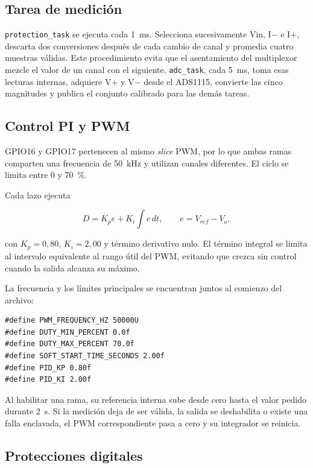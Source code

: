 \documentclass[conference]{IEEEtran}
\begin{document}
\subsection{Tarea de medición}

\texttt{protection\_task} se ejecuta cada 1~ms. Selecciona sucesivamente Vin, I$-$ e I$+$, descarta dos conversiones después de cada cambio de canal y promedia cuatro muestras válidas. Este procedimiento evita que el asentamiento del multiplexor mezcle el valor de un canal con el siguiente. \texttt{adc\_task}, cada 5~ms, toma esas lecturas internas, adquiere V$+$ y V$-$ desde el ADS1115, convierte las cinco magnitudes y publica el conjunto calibrado para las demás tareas.

\subsection{Control PI y PWM}

GPIO16 y GPIO17 pertenecen al mismo \textit{slice} PWM, por lo que ambas ramas comparten una frecuencia de 50~kHz y utilizan canales diferentes. El ciclo se limita entre 0 y 70~\%.

Cada lazo ejecuta

\begin{equation}
D=K_p e+K_i\int e\,dt, \qquad e=V_{ref}-V_o,
\end{equation}

con $K_p=0,80$, $K_i=2,00$ y término derivativo nulo. El término integral se limita al intervalo equivalente al rango útil del PWM, evitando que crezca sin control cuando la salida alcanza su máximo.

La frecuencia y los límites principales se encuentran juntos al comienzo del archivo:

\begin{lstlisting}[caption={Parámetros principales de PWM y control.}]
#define PWM_FREQUENCY_HZ 50000U
#define DUTY_MIN_PERCENT 0.0f
#define DUTY_MAX_PERCENT 70.0f
#define SOFT_START_TIME_SECONDS 2.00f
#define PID_KP 0.80f
#define PID_KI 2.00f
\end{lstlisting}

Al habilitar una rama, su referencia interna sube desde cero hasta el valor pedido durante 2~s. Si la medición deja de ser válida, la salida se deshabilita o existe una falla enclavada, el PWM correspondiente pasa a cero y su integrador se reinicia.

\subsection{Protecciones digitales}
\end{document}

